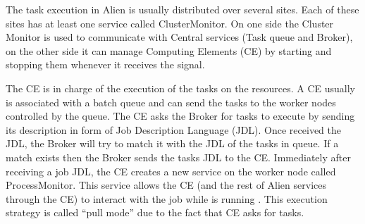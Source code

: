 
The task execution in Alien is usually distributed over several sites. Each of
these sites has at least one service called ClusterMonitor. On one side the
Cluster Monitor is used to communicate with Central services (Task queue and
Broker), on the other side it can manage Computing Elements (CE) by starting and
stopping them whenever it receives the signal.

The CE is in charge of the execution of the tasks on the resources. A CE usually
is associated with a batch queue and can send the tasks to the worker nodes
controlled by the queue. The CE asks the Broker for tasks to execute by sending
its description in form of Job Description Language (JDL). Once received the
JDL, the Broker will try to match it with the JDL of the tasks in queue. If a
match exists then the Broker sends the tasks JDL to the CE. Immediately after
receiving a job JDL, the CE creates a new service on the worker node called
ProcessMonitor. This service allows the CE (and the rest of Alien services
through the CE) to interact with the job while is running \cite{Saiz2003}. This
execution strategy is called ``pull mode'' due to the fact that CE asks for
tasks.




